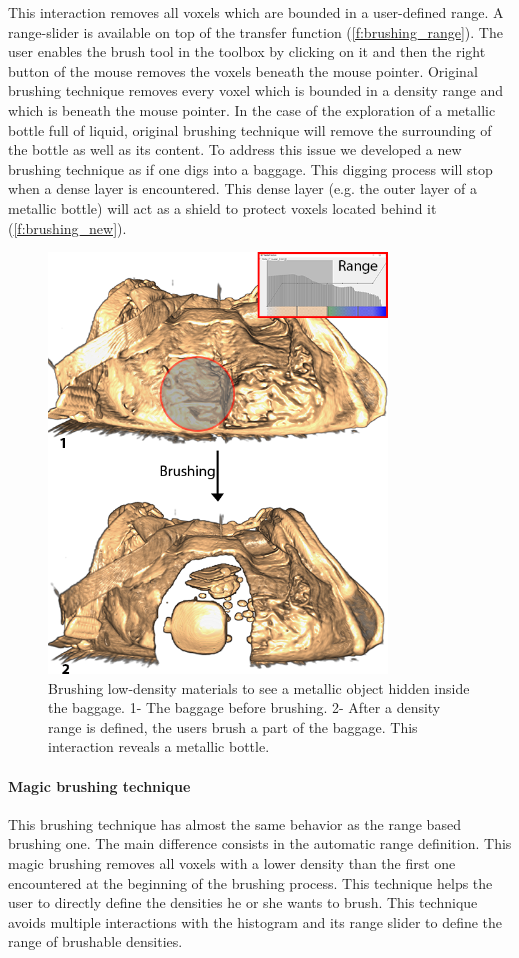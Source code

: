 This interaction removes all voxels which are bounded in a user-defined range. A range-slider is available on top of the transfer function (\autoref{f:brushing_range}). The user enables the brush tool in the toolbox by clicking on it and then the right button of the mouse removes the voxels beneath the mouse pointer.
Original brushing technique removes every voxel which is bounded in a density range and which is beneath the mouse pointer. In the case of the exploration of a metallic bottle full of liquid, original brushing technique will remove the surrounding of the bottle as well as its content. To address this issue we developed a new brushing technique as if one digs into a baggage. This digging process will stop when a dense layer is encountered. This dense layer (e.g. the outer layer of a metallic bottle) will act as a shield to protect voxels located behind it (\autoref{f:brushing_new}).

 \begin{figure}
\centering	\includegraphics[width=9cm]{Figures/brushing-range.png}
	\caption[Brushing low-density materials to see a metallic object hidden inside the baggage.]{ Brushing low-density materials to see a metallic object hidden inside the baggage. 1- The baggage before brushing. 2- After a density range is defined, the users brush a part of the baggage. This interaction reveals a metallic bottle.   }
	\label{f:brushing_range}
\end{figure}

\paragraph{Magic brushing technique}
This brushing technique has almost the same behavior as the range based brushing one. The main difference consists in the automatic range definition. This magic brushing removes all voxels with a lower density than the first one encountered at the beginning of the brushing process. This technique helps the user to directly define the densities he or she wants to brush. This technique avoids multiple interactions with the histogram and its range slider to define the range of brushable densities.

